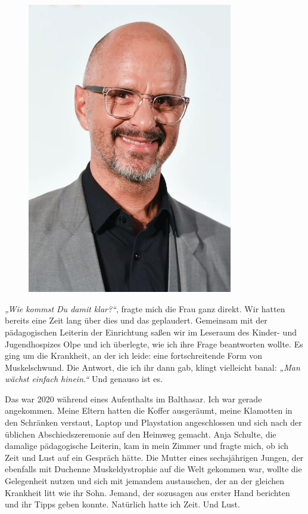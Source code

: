 \documentclass[fontsize=14pt,a4paper,headinclude,DIV=calc,automark]{scrbook}
\begin{document}
\begin{figure}[ht] %
    \centering %
    \includegraphics[width=0.8\textwidth]{Fotos/ChristophMariaHerbst.jpg}
    \label{fig:ChristophMariaHerbst} %
\end{figure}


\textit{„Wie kommst Du damit klar?“}, fragte mich die Frau ganz direkt. Wir hatten bereits eine Zeit lang über dies und das geplaudert. Gemeinsam mit der pädagogischen Leiterin der Einrichtung saßen wir im Leseraum des Kinder- und Jugendhospizes Olpe und ich überlegte, wie ich ihre Frage beantworten wollte. Es ging um die Krankheit, an der ich leide: eine fortschreitende Form von Muskelschwund. Die Antwort, die ich ihr dann gab, klingt vielleicht banal: \textit{„Man wächst einfach hinein.“} Und genauso ist es.

Das war 2020 während eines Aufenthalts im Balthasar. Ich war gerade angekommen. Meine Eltern hatten die Koffer ausgeräumt, meine Klamotten in den Schränken verstaut, Laptop und Playstation angeschlossen und sich nach der üblichen Abschiedszeremonie auf den Heimweg gemacht. Anja Schulte, die damalige pädagogische Leiterin, kam in mein Zimmer und fragte mich, ob ich Zeit und Lust auf ein Gespräch hätte. Die Mutter eines sechsjährigen Jungen, der ebenfalls mit Duchenne Muskeldystrophie auf die Welt gekommen war, wollte die Gelegenheit nutzen und sich mit jemandem austauschen, der an der gleichen Krankheit litt wie ihr Sohn. Jemand, der sozusagen aus erster Hand berichten und ihr Tipps geben konnte.
Natürlich hatte ich Zeit. Und Lust.
\end{document}
